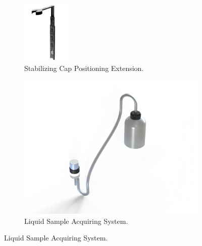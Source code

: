 \begin{figure}[ht!] 
    \centering
    \begin{subfigure}[b]{0.49\columnwidth} 
        \centering
        \includegraphics[height=3cm]{Sections/2Design Rationale/images/Stabilizing Cap Positioning Extension (SCPE) .jpg}
        \caption{\scriptsize Stabilizing Cap Positioning Extension.}
        \label{fig:scpe}
    \end{subfigure}
    \hfill
    \begin{subfigure}[b]{0.49\columnwidth}
        \centering
        \includegraphics[width=\linewidth]{Sections/2Design Rationale/images/Pump.png}
        \caption{\scriptsize Liquid Sample Acquiring System.}
        \label{fig:pump}
    \end{subfigure}

    \vspace{0.2cm}


\end{figure}
